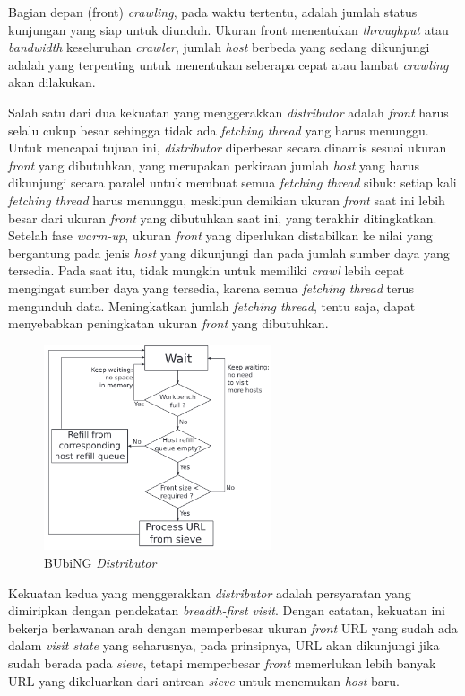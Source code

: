 Bagian depan (front) \emph{crawling}, pada waktu tertentu, adalah jumlah status kunjungan yang siap untuk diunduh. Ukuran front menentukan \emph{throughput} atau \emph{bandwidth} keseluruhan \emph{crawler}, jumlah \emph{host} berbeda yang sedang dikunjungi adalah yang terpenting untuk menentukan seberapa cepat atau lambat \emph{crawling} akan dilakukan.
	
Salah satu dari dua kekuatan yang menggerakkan \emph{distributor} adalah \emph{front} harus selalu cukup besar sehingga tidak ada \emph{fetching thread} yang harus menunggu. Untuk mencapai tujuan ini, \emph{distributor} diperbesar secara dinamis sesuai ukuran \emph{front} yang dibutuhkan, yang merupakan perkiraan jumlah \emph{host} yang harus dikunjungi secara paralel untuk membuat semua \emph{fetching thread} sibuk: setiap kali \emph{fetching thread} harus menunggu, meskipun demikian ukuran \emph{front} saat ini lebih besar dari ukuran \emph{front} yang dibutuhkan saat ini, yang terakhir ditingkatkan. Setelah fase \emph{warm-up}, ukuran \emph{front} yang diperlukan distabilkan ke nilai yang bergantung pada jenis \emph{host} yang dikunjungi dan pada jumlah sumber daya yang tersedia. Pada saat itu, tidak mungkin untuk memiliki \emph{crawl} lebih cepat mengingat sumber daya yang tersedia, karena semua \emph{fetching thread} terus mengunduh data. Meningkatkan jumlah \emph{fetching thread}, tentu saja, dapat menyebabkan peningkatan ukuran \emph{front} yang dibutuhkan.

\begin{figure}[H]
  \centering{}
  \includegraphics[width=0.6\textwidth]{gambar/bubing_distributor}
  \caption{BUbiNG \emph{Distributor}}
\end{figure}

Kekuatan kedua yang menggerakkan \emph{distributor} adalah persyaratan yang dimiripkan dengan pendekatan \emph{breadth-first visit}. Dengan catatan, kekuatan ini bekerja berlawanan arah dengan memperbesar ukuran \emph{front} URL yang sudah ada dalam \emph{visit state} yang seharusnya, pada prinsipnya, URL akan dikunjungi jika sudah berada pada \emph{sieve}, tetapi memperbesar \emph{front} memerlukan lebih banyak URL yang dikeluarkan dari antrean \emph{sieve} untuk menemukan \emph{host} baru.

